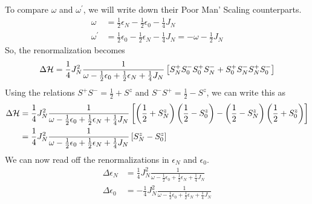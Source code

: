 \documentclass[12pt,twoside]{article}
\numberwithin{equation}{section}
\begin{document}
To compare \(\omega\) and \(\omega^\prime\), we will write down their Poor Man' Scaling counterparts.
\begin{equation}\begin{aligned}
	\omega &= \frac{1}{2}\epsilon_N - \frac{1}{2}\epsilon_0 - \frac{1}{4}J_N\\
	\omega^\prime &= \frac{1}{2}\epsilon_0 - \frac{1}{2}\epsilon_N - \frac{1}{4}J_N = -\omega - \frac{1}{2}J_N
\end{aligned}\end{equation}
So, the renormalization becomes
\begin{equation}
	\Delta \mathcal{H} = \frac{1}{4}J_N^2 \frac{1}{\omega - \frac{1}{2}\epsilon_0 + \frac{1}{2}\epsilon_N + \frac{1}{4}J_N}\left[S_N^+S_0^- S_0^+ S_N^- + S_0^+ S_N^- S_N^+S_0^-\right]
\end{equation}
Using the relations \(S^+ S^- = \frac{1}{2} + S^z\) and \(S^- S^+ = \frac{1}{2} - S^z\), we can write this as
\begin{equation}\begin{aligned}
	\Delta \mathcal{H} &= \frac{1}{4}J_N^2 \frac{1}{\omega - \frac{1}{2}\epsilon_0 + \frac{1}{2}\epsilon_N + \frac{1}{4}J_N}\left[\left(\frac{1}{2} + S_N^z\right)\left(\frac{1}{2} - S_0^z\right) - \left(\frac{1}{2} - S_N^z\right)\left(\frac{1}{2} + S_0^z\right)\right]\\
		    &= \frac{1}{4}J_N^2 \frac{1}{\omega - \frac{1}{2}\epsilon_0 + \frac{1}{2}\epsilon_N + \frac{1}{4}J_N}\left[S_N^z - S_0^z\right]
\end{aligned}\end{equation}
We can now read off the renormalizations in \(\epsilon_N\) and \(\epsilon_0\).
\begin{equation}\begin{aligned}
	\Delta \epsilon_N &= \frac{1}{4}J_N^2 \frac{1}{\omega - \frac{1}{2}\epsilon_0 + \frac{1}{2}\epsilon_N + \frac{1}{4}J_N}\\
	\Delta \epsilon_0 &= -\frac{1}{4}J_N^2 \frac{1}{\omega - \frac{1}{2}\epsilon_0 + \frac{1}{2}\epsilon_N + \frac{1}{4}J_N}
\end{aligned}\end{equation}
\end{document}
